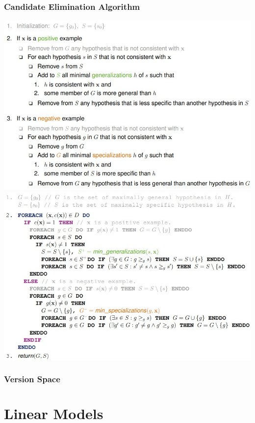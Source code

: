 \documentclass[11pt,a4paper]{article}
\begin{document}
\begin{flushleft}
\subsubsection{Candidate Elimination Algorithm}
\includegraphics[width=\textwidth]{Candidate1}
\includegraphics[width=\textwidth]{Candidate2}

\subsubsection{Version Space}

\section{Linear Models}

\end{flushleft}
\end{document}
